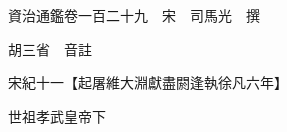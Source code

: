 










 


 
 


 

  
  
  
  
  





  
  
  
  
  
 
  

  

  
  
  



  

 
 

  
   




  

  
  


  　　資治通鑑卷一百二十九　宋　司馬光　撰

　　胡三省　音註

　　宋紀十一【起屠維大淵獻盡閼逢執徐凡六年】

　　世祖孝武皇帝下

